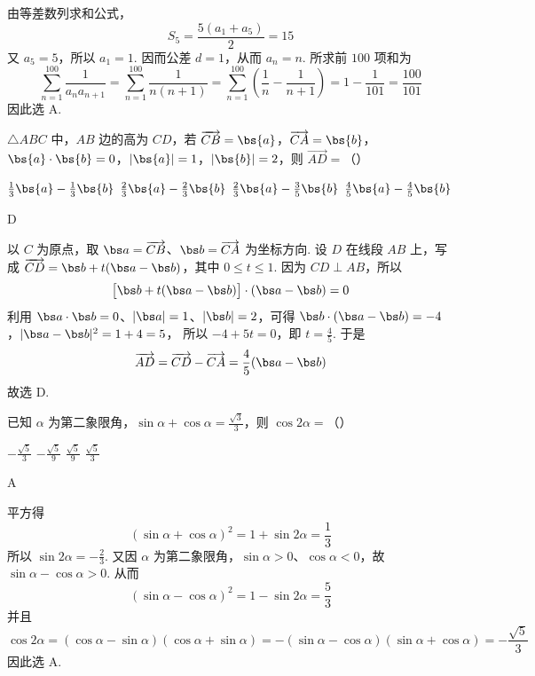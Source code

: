 \begin{solution}
由等差数列求和公式，
\[
S_5=\frac{5(a_1+a_5)}2=15
\]
又 \(a_5=5\)，所以 \(a_1=1\). 因而公差 \(d=1\)，从而 \(a_n=n\). 所求前 \(100\) 项和为
\[
\sum_{n=1}^{100}\frac1{a_na_{n+1}}
=\sum_{n=1}^{100}\frac1{n(n+1)}
=\sum_{n=1}^{100}\left(\frac1n-\frac1{n+1}\right)
=1-\frac1{101}=\frac{100}{101}
\]
因此选 A.
\end{solution}

\begin{problem}
\(\triangle ABC\) 中，\(AB\) 边的高为 \(CD\)，若 \(\overrightarrow{CB} = \bs{a}\)，\(\overrightarrow{CA} = \bs{b}\)，\(\bs{a} \cdot \bs{b} = 0\)，\(|\bs{a}| = 1\)，\(|\bs{b}| = 2\)，则 \(\overrightarrow{AD} =\)（\quad）

\choices
    {\(\frac{1}{3}\bs{a} - \frac{1}{3}\bs{b}\)}
    {\(\frac{2}{3}\bs{a} - \frac{2}{3}\bs{b}\)}
    {\(\frac{2}{3}\bs{a} - \frac{3}{5}\bs{b}\)}
    {\(\frac{4}{5}\bs{a} - \frac{4}{5}\bs{b}\)}
\end{problem}

\begin{answer}
D
\end{answer}

\begin{solution}
以 \(C\) 为原点，取 \(\bs a=\overrightarrow{CB}\)、\(\bs b=\overrightarrow{CA}\) 为坐标方向. 设 \(D\) 在线段 \(AB\) 上，写成 \(\overrightarrow{CD}=\bs b+t(\bs a-\bs b)\)，其中 \(0\leqslant t\leqslant1\).
因为 \(CD\perp AB\)，所以
\[
\bigl[\bs b+t(\bs a-\bs b)\bigr]\cdot(\bs a-\bs b)=0
\]
利用 \(\bs a\cdot\bs b=0\)、\(|\bs a|=1\)、\(|\bs b|=2\)，可得 \(\bs b\cdot(\bs a-\bs b)=-4\)，\(|\bs a-\bs b|^2=1+4=5\)，
所以 \(-4+5t=0\)，即 \(t=\frac45\). 于是
\[
\overrightarrow{AD}=\overrightarrow{CD}-\overrightarrow{CA}
=\frac45(\bs a-\bs b)
\]
故选 D.
\end{solution}

\begin{problem}
已知 \(\alpha\) 为第二象限角，\(\sin \alpha + \cos \alpha = \frac{\sqrt{3}}{3}\)，则 \(\cos 2\alpha =\)（\quad）

\choices
    {\(-\frac{\sqrt{5}}{3}\)}
    {\(-\frac{\sqrt{5}}{9}\)}
    {\(\frac{\sqrt{5}}{9}\)}
    {\(\frac{\sqrt{5}}{3}\)}
\end{problem}

\begin{answer}
A
\end{answer}

\begin{solution}
平方得
\[
(\sin\alpha+\cos\alpha)^2=1+\sin2\alpha=\frac13
\]
所以 \(\sin2\alpha=-\frac23\). 又因 \(\alpha\) 为第二象限角，\(\sin\alpha>0\)、\(\cos\alpha<0\)，故 \(\sin\alpha-\cos\alpha>0\). 从而
\[
(\sin\alpha-\cos\alpha)^2=1-\sin2\alpha=\frac53
\]
并且
\[
\cos2\alpha=(\cos\alpha-\sin\alpha)(\cos\alpha+\sin\alpha)
=-(\sin\alpha-\cos\alpha)(\sin\alpha+\cos\alpha)
=-\frac{\sqrt5}{3}
\]
因此选 A.
\end{solution}

